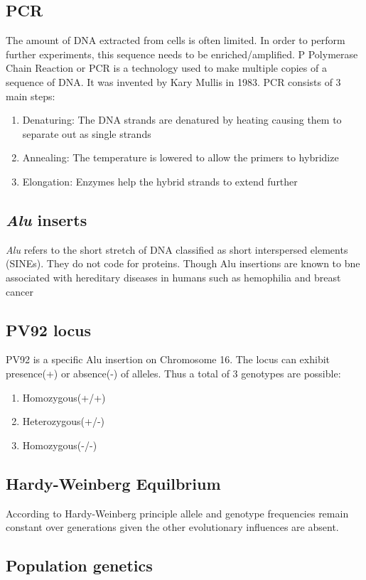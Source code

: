 \documentclass[paper=a4, fontsize=11pt]{scrartcl} %
\numberwithin{equation}{section} %
\numberwithin{figure}{section} %
\numberwithin{table}{section} %
\begin{document}
\subsection{PCR}
The amount of DNA extracted from cells is often limited. In order to perform further experiments, this sequence needs to be enriched/amplified. P
Polymerase Chain Reaction or PCR is a technology used to make multiple copies of a sequence of DNA. It was invented by Kary Mullis in 1983. \cite{bartlett2003short}
PCR consists of 3 main steps:
\begin{enumerate}
\item Denaturing: The DNA strands are denatured by heating causing them to separate out as single strands
\item Annealing: The temperature is lowered to allow the primers to hybridize

\item Elongation: Enzymes help the hybrid strands to extend further
\end{enumerate}

\subsection{\textit{Alu} inserts}
\textit{Alu} refers to the short stretch of DNA classified as short interspersed elements (SINEs). They do not code for proteins. Though Alu insertions are known to bne associated with hereditary diseases in humans such as hemophilia and breast cancer\cite{batzer2002alu}
\subsection{PV92 locus}
PV92 is a specific Alu insertion on Chromosome 16. The locus can exhibit presence(+) or absence(-) of alleles. Thus a total of 3 genotypes are possible:
\begin{enumerate}
\item Homozygous(+/+)
\item Heterozygous(+/-)
\item Homozygous(-/-)
\end{enumerate} 
\subsection{Hardy-Weinberg Equilbrium}
According to Hardy-Weinberg principle allele and genotype frequencies remain constant over generations given the other evolutionary influences are absent. 
\subsection{Population genetics}
\end{document}
